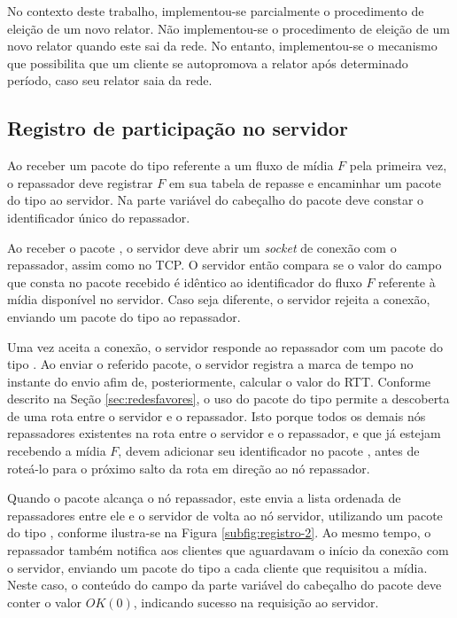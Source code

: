 No contexto deste trabalho, implementou-se parcialmente o procedimento de eleição de um novo relator. 
Não implementou-se o procedimento de eleição de um novo relator quando este sai da rede. 
No entanto, implementou-se o mecanismo que possibilita que um cliente se autopromova a relator após determinado período, caso seu relator saia da rede. 

\subsection{Registro de participação no servidor}
\label{sec:registro-impl}

Ao receber um pacote do tipo  referente a um fluxo de mídia $F$ pela primeira vez, o repassador deve registrar $F$ em sua tabela de repasse e encaminhar um pacote do tipo  ao servidor. 
Na parte variável do cabeçalho do pacote  deve constar o identificador único do repassador.

Ao receber o pacote , o servidor deve abrir um \textit{socket} de conexão com o repassador, assim como no TCP.
O servidor então compara se o valor do campo  que consta no pacote recebido é idêntico ao identificador do fluxo $F$ referente à mídia disponível no servidor. Caso seja diferente, o servidor rejeita a conexão, enviando um pacote do tipo  ao repassador. 

Uma vez aceita a conexão, o servidor responde ao repassador com um pacote do tipo . Ao enviar o referido pacote, o servidor registra a marca de tempo no instante do envio afim de, posteriormente, calcular o valor do RTT. 
Conforme descrito na Seção \ref{sec:redesfavores}, o uso do pacote do tipo  permite a descoberta de uma rota entre o servidor e o repassador.
Isto porque todos os demais nós repassadores existentes na rota entre o servidor e o repassador, e que já estejam recebendo a mídia $F$, devem adicionar seu identificador no pacote , antes de roteá-lo para o próximo salto da rota em direção ao nó repassador.

Quando o pacote  alcança o nó repassador, este envia a lista ordenada de repassadores entre ele e o servidor de volta ao nó servidor, utilizando um pacote do tipo , conforme ilustra-se na Figura \ref{subfig:registro-2}.
Ao mesmo tempo, o repassador também notifica aos clientes que aguardavam o início da conexão com o servidor, enviando um pacote do tipo  a cada cliente que requisitou a mídia. 
Neste caso, o conteúdo do campo  da parte variável do cabeçalho do pacote  deve conter o valor $OK (0)$, indicando sucesso na requisição ao servidor.

